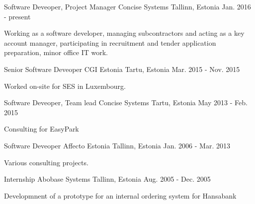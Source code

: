 \begin{cventries}
  
  \cventry
    {Software Deveoper, Project Manager}
    {Concise Systems}
    {Tallinn, Estonia}
    {Jan. 2016 - present}
    {
      \begin{cvitems}
        \item {Working as a software developer, managing subcontractors and acting as a  key account manager, participating in recruitment and tender application preparation, minor office IT work.}
      \end{cvitems}
    }
  \cventry
    {Senior Software Deveoper}
    {CGI Estonia}
    {Tartu, Estonia}
    {Mar. 2015 - Nov. 2015}
    {
      \begin{cvitems}
        \item {Worked on-site for SES in Luxembourg.}
      \end{cvitems}
    }
  \cventry
    {Software Deveoper, Team lead}
    {Concise Systems}
    {Tartu, Estonia}
    {May 2013 - Feb. 2015}
    {
      \begin{cvitems}
        \item {Consulting for EasyPark}
      \end{cvitems}
    }
  \cventry
    {Software Deveoper}
    {Affecto Estonia}
    {Tallinn, Estonia}
    {Jan. 2006 - Mar. 2013}
    {
      \begin{cvitems}
        \item {Various consulting projects.}
      \end{cvitems}
    }
  \cventry
    {Internship}
    {Abobase Systems}
    {Tallinn, Estonia}
    {Aug. 2005 - Dec. 2005}
    {
      \begin{cvitems}
        \item {Developmnent of a prototype for an internal ordering system for Hansabank}
      \end{cvitems}
    }
\end{cventries}
